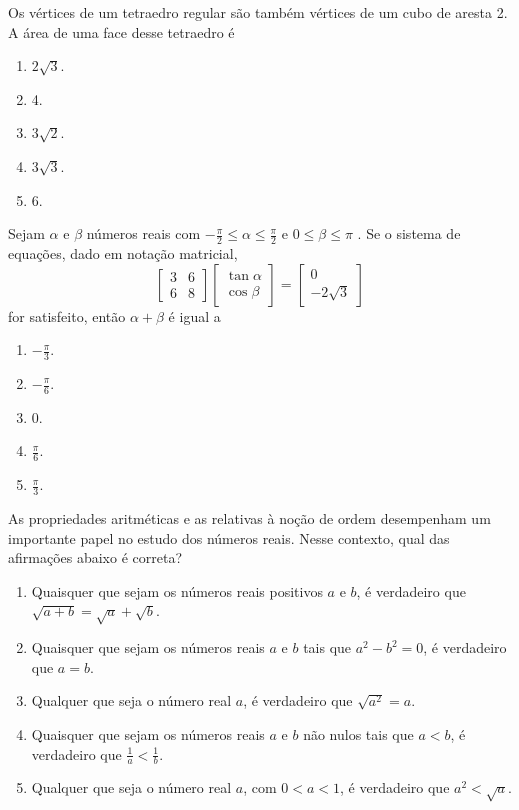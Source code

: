 \documentclass[twocolumn,landscape]{amsart}
\begin{document}
\begin{questao}
  Os vértices de um tetraedro regular são também vértices de um cubo de
  aresta 2. A área de uma face desse tetraedro é

  \begin{enumerate}[\bf a.]
    \item $2\sqrt{3}$. %
    \item 4.
    \item $3\sqrt{2}$.
    \item $3\sqrt{3}$.
    \item 6.
  \end{enumerate}
\end{questao}
\clearpage

\begin{questao} 
  Sejam $\alpha$ e $\beta$ números reais com
  $-\frac{\pi}{2}\leq\alpha\leq\frac{\pi}{2}$ e $0\leq\beta\leq\pi$ . Se o
  sistema de equações, dado em notação matricial, \[
  \begin{bmatrix}
    3&6\\
    6&8
  \end{bmatrix}
  \begin{bmatrix}
    \tan\alpha\\\cos\beta
  \end{bmatrix} =
  \begin{bmatrix}
    0\\-2\sqrt{3}
  \end{bmatrix}\] for satisfeito, então $\alpha+\beta$ é igual a

  \begin{enumerate}[\bf a.]
    \item $-\frac{\pi}{3}$.
    \item $-\frac{\pi}{6}$. %
    \item $0$.
    \item $\frac{\pi}{6}$.
    \item $\frac{\pi}{3}$.
  \end{enumerate}
\end{questao}
\clearpage

\begin{questao}
  As propriedades aritméticas e as relativas à noção de ordem
  desempenham um importante papel no estudo dos números reais. Nesse
  contexto, qual das afirmações abaixo é correta?
  \begin{enumerate}[\bf a.]
    \item Quaisquer que sejam os números reais positivos $a$ e $b$, é
    verdadeiro que $\sqrt{a+b}=\sqrt{a}+\sqrt{b}$.
    \item Quaisquer que sejam os números reais $a$ e $b$ tais que
    $a^2-b^2=0$, é verdadeiro que $a=b$.
    \item Qualquer que seja o número real $a$, é verdadeiro que
    $\sqrt{a^2}=a$.
    \item Quaisquer que sejam os números reais $a$ e $b$ não nulos tais
    que $a<b$, é verdadeiro que $\frac{1}{a}<\frac{1}{b}$.
    \item Qualquer que seja o número real $a$, com $0<a<1$, é verdadeiro
    que $a^2<\sqrt{a}$. %
  \end{enumerate}
\end{questao}
\clearpage
\end{document}
